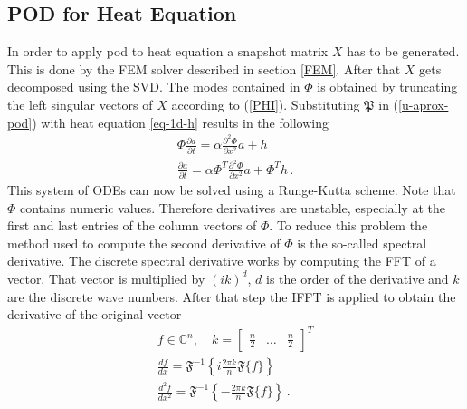 \subsection{POD for Heat Equation}
In order to apply pod to heat equation a snapshot matrix \(X\) has to be generated.
This is done by the FEM solver described in section \ref{FEM}.
After that \(X\) gets decomposed using the SVD.
The modes contained in \(\Phi\) is obtained by truncating the left singular vectors of \(X\) according to (\ref{PHI}).
Substituting \(\mathfrak{P}\) in (\ref{u-aprox-pod}) with heat equation \ref{eq-1d-h} results in the following
\begin{gather}
\Phi \frac{\partial a}{\partial t}  = \alpha \frac{\partial^{2} \Phi}{\partial x^{2}} a + h\\
\frac{\partial a}{\partial t} = \alpha \Phi^{T}  \frac{\partial^{2} \Phi}{\partial x^{2}} a + \Phi^{T}h \,.
\end{gather}
This system of ODEs can now be solved using a Runge-Kutta scheme.
Note that \(\Phi\) contains numeric values.
Therefore derivatives are unstable, especially at the first and last entries of the column vectors of \(\Phi\).
To reduce this problem the method used to compute the second derivative of \(\Phi\) is the so-called spectral derivative.
The discrete spectral derivative works by computing the FFT of a vector.
That vector is multiplied by \((ik)^{d}\), \(d\) is the order of the derivative and \(k\) are the discrete wave numbers.
After that step the IFFT is applied to obtain the derivative of the original vector \cite{brunton_kutz_2019f}
\begin{gather}
f \in \mathbb{C}^{n}, \quad k = \begin{bmatrix}
\frac{n}{2} & \hdots & \frac{n}{2}
\end{bmatrix}^{T} \\
\frac{df}{dx} = \mathfrak{F}^{-1}\left\{i \frac{2 \pi k}{n} \mathfrak{F}\{f\}\right\} \\
\frac{d^{2}f}{dx^{2}} = \mathfrak{F}^{-1}\left\{-\frac{2 \pi k}{n} \mathfrak{F}\{f\}\right\} \,.
\end{gather}

